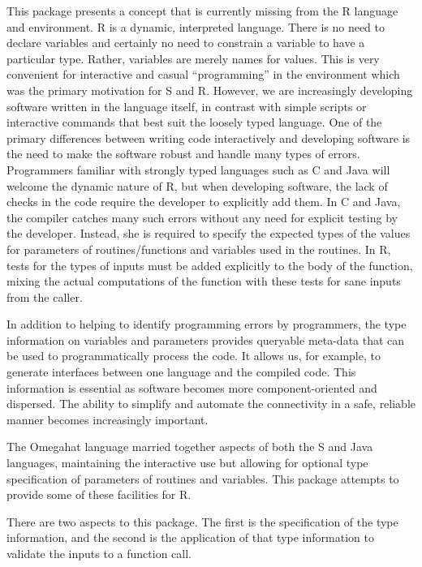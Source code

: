\documentclass{article}
\begin{document}
This package presents a concept that is currently missing from the R
language and environment.  R is a dynamic, interpreted language. There
is no need to declare variables and certainly no need to constrain a
variable to have a particular type.  Rather, variables are merely
names for values.  This is very convenient for interactive and casual
``programming'' in the environment which was the primary motivation
for S and R.  However, we are increasingly developing software written
in the language itself, in contrast with simple scripts or interactive
commands that best suit the loosely typed language.  One of the
primary differences between writing code interactively and developing
software is the need to make the software robust and handle many types
of errors.  Programmers familiar with strongly typed languages such as
C and Java will welcome the dynamic nature of R, but when developing
software, the lack of checks in the code require the developer to
explicitly add them. In C and Java, the compiler catches many such
errors without any need for explicit testing by the developer.
Instead, she is required to specify the expected types of the values
for parameters of routines/functions and variables used in the
routines.  In R, tests for the types of inputs must be added
explicitly to the body of the function, mixing the actual computations
of the function with these tests for sane inputs from the caller.  


In addition to helping to identify programming errors by programmers,
the type information on variables and parameters provides queryable
meta-data that can be used to programmatically process the code.  It
allows us, for example, to generate interfaces between one language
and the compiled code. This information is essential as software
becomes more component-oriented and dispersed.  The ability to
simplify and automate the connectivity in a safe, reliable manner
becomes increasingly important.


The Omegahat language married together aspects of both the S and Java
languages, maintaining the interactive use but allowing for optional
type specification of parameters of routines and variables.  This
package attempts to provide some of these facilities for R.


There are two aspects to this package. The first is the specification
of the type information, and the second is the application of that
type information to validate the inputs to a function call.
\end{document}
